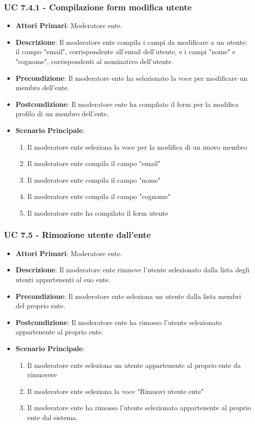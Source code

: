 			\subsubsection{UC 7.4.1 - Compilazione form modifica utente}
			\begin{itemize}
				\item \textbf{Attori Primari}: Moderatore ente.
				\item \textbf{Descrizione}: Il moderatore ente compila i campi da modificare a un utente: il campo "email", corrispondente all'email dell'utente, e i campi "nome" e "cognome", corrispondenti al nominativo dell'utente.
				\item \textbf{Precondizione}: Il moderatore ente ha selezionato la voce per modificare un membro dell'ente.
				\item \textbf{Postcondizione}: Il moderatore ente ha compilato il form per la modifica profilo di un membro dell'ente.
				\item \textbf{Scenario Principale}:
				\begin{enumerate}
					\item{Il moderatore ente seleziona la voce per la modifica di un nuovo membro}
					\item{Il moderatore ente compila il campo "email"}
					\item{Il moderatore ente compila il campo "nome"}
					\item{Il moderatore ente compila il campo "cognome"}
					\item{Il moderatore ente ha compilato il form utente}
				\end{enumerate}	
			\end{itemize}
			
			\subsubsection{UC 7.5 - Rimozione utente dall'ente}
			\begin{itemize}
				\item \textbf{Attori Primari}: Moderatore ente.
				\item \textbf{Descrizione}: Il moderatore ente rimuove l'utente selezionato dalla lista degli utenti appartenenti al suo ente.
				\item \textbf{Precondizione}: Il moderatore ente seleziona un utente dalla lista membri del proprio ente.
				\item \textbf{Postcondizione}: Il moderatore ente ha rimosso l'utente selezionato appartenente al proprio ente.
				\item \textbf{Scenario Principale}:
				\begin{enumerate}
					\item{Il moderatore ente seleziona un utente appartenente al proprio ente da rimuovere}
					\item{Il moderatore ente seleziona la voce "Rimuovi utente ente"}
					\item{Il moderatore ente ha rimosso l'utente selezionato appartenente al proprio ente dal sistema.}
				\end{enumerate}		
			\end{itemize}

